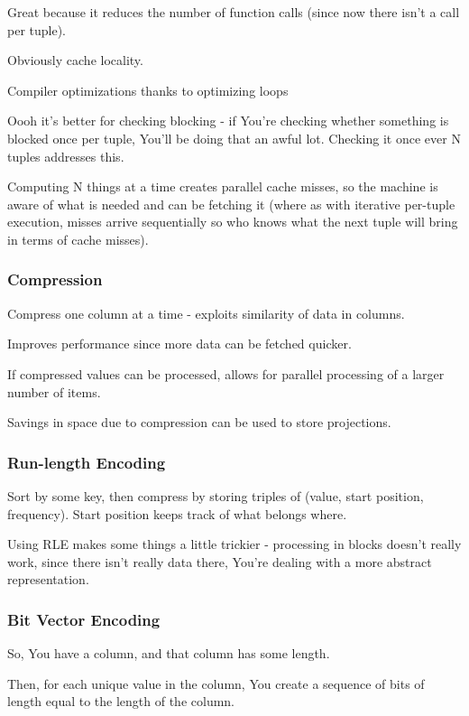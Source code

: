 \documentclass{article}
\begin{document}
			Great because it reduces  the number of function calls (since now there isn't a call per tuple).
			
			Obviously cache locality.
			
			Compiler optimizations thanks to optimizing loops
			
			Oooh it's better for checking blocking - if You're checking whether something is blocked once per tuple, You'll be doing that an awful lot. Checking it once ever N tuples addresses this.
			
			Computing N things at a time creates parallel cache misses, so the machine is aware of what is needed and can be fetching it (where as with iterative per-tuple execution, misses arrive sequentially so who knows what the next tuple will bring in terms of cache misses).
			
		\subsubsection{Compression}
			
			Compress one column at a time - exploits similarity of data in columns.
			
			Improves performance since more data can be fetched quicker.
			
			If compressed values can be processed, allows for parallel processing of a larger number of items.
			
			Savings in space due to compression can be used to store projections.
			
		\subsubsection{Run-length Encoding}
		
			Sort by some key, then compress by storing triples of (value, start position, frequency). Start position keeps track of what belongs where.
			
			Using RLE makes some things a little trickier - processing in blocks doesn't really work, since there isn't really data there, You're dealing with a more abstract representation.
			
		\subsubsection{Bit Vector Encoding}
		
			So, You have a column, and that column has some length.
			
			Then, for each unique value in the column, You create a sequence of bits of length equal to the length of the column.
			
\end{document}
